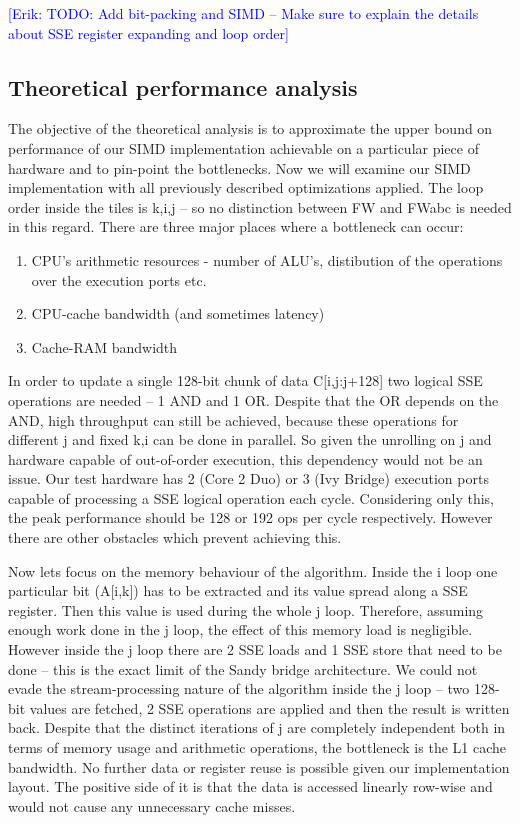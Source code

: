 \documentclass[letterpaper]{article}
\newcommand{\erik}[1]{\textcolor{blue}{[Erik: #1]}}
\begin{document}
\erik{TODO: Add bit-packing and SIMD -- Make sure to explain the details about SSE register expanding and loop order}

\subsection{Theoretical performance analysis}
The objective of the theoretical analysis is to approximate the upper bound on performance of our SIMD implementation
achievable on a particular piece of hardware and to pin-point the bottlenecks. Now we will examine our 
SIMD implementation with all previously described optimizations applied. 
The loop order inside the tiles is k,i,j -- so no distinction between FW and FWabc is needed in this regard. 
There are three major places where a bottleneck can occur:
\begin{enumerate}
\item CPU's arithmetic resources - number of ALU's, distibution of the operations over the execution ports etc. 
\item CPU-cache bandwidth (and sometimes latency)
\item Cache-RAM bandwidth
\end{enumerate}

In order to update a single 128-bit chunk of data C[i,j:j+128] two logical SSE operations are needed -- 1 AND and 1 OR. Despite that the OR depends on the AND, 
high throughput can still be achieved, because these operations for different j and fixed k,i can be done in parallel. So given the unrolling on j and hardware capable of
out-of-order execution, this dependency would not be an issue. Our test hardware has 2 (Core 2 Duo) or 3 (Ivy Bridge) execution ports capable of processing a SSE logical operation 
each cycle. Considering only this, the peak performance should be 128 or 192 ops per cycle respectively. However there are other obstacles which prevent achieving this. 

Now lets focus on the memory behaviour of the algorithm. Inside the i loop one particular bit (A[i,k]) has to be extracted and its value spread along a SSE register. Then this value is 
used during the whole j loop. Therefore, assuming enough work done in the j loop, the effect of this memory load is negligible. 
However inside the j loop there are 2 SSE loads and 1 SSE store that need to be done -- this is the exact limit of the Sandy bridge architecture. 
We could not evade the stream-processing nature of the algorithm inside the j loop -- two 128-bit values are fetched, 2 SSE operations are applied and then the result is written back. 
Despite that the distinct iterations of j are completely independent both in terms of memory usage and arithmetic operations, the 
bottleneck is the L1 cache bandwidth. No further data or register reuse is possible given our implementation layout. The positive side of it is that the data is accessed 
linearly row-wise and would not cause any unnecessary cache misses. 
\end{document}
